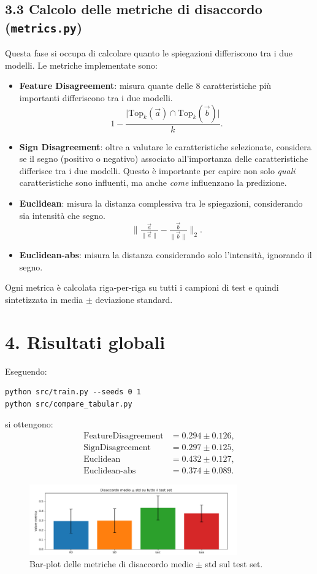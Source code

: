 \documentclass[a4paper,11pt]{article}
\begin{document}
\subsection*{3.3 Calcolo delle metriche di disaccordo (\texttt{metrics.py})}
Questa fase si occupa di calcolare quanto le spiegazioni differiscono tra i due modelli. Le metriche implementate sono:
\begin{itemize}
\item \textbf{Feature Disagreement}: misura quante delle 8 caratteristiche più importanti differiscono tra i due modelli.
  \[
  1 - \frac{\lvert\mathrm{Top}_k(\vec a)\cap \mathrm{Top}_k(\vec b)\rvert}{k}.
  \]
\item \textbf{Sign Disagreement}: oltre a valutare le caratteristiche selezionate, considera se il segno (positivo o negativo) associato all'importanza delle caratteristiche differisce tra i due modelli. Questo è importante per capire non solo \emph{quali} caratteristiche sono influenti, ma anche \emph{come} influenzano la predizione.
\item \textbf{Euclidean}: misura la distanza complessiva tra le spiegazioni, considerando sia intensità che segno.
  \[
  \|\tfrac{\vec a}{\|\vec a\|}-\tfrac{\vec b}{\|\vec b\|}\|_2.
  \]
\item \textbf{Euclidean-abs}: misura la distanza considerando solo l’intensità, ignorando il segno.
\end{itemize}
Ogni metrica è calcolata riga‐per‐riga su tutti i campioni di test e quindi sintetizzata in media \(\pm\) deviazione standard.

\section*{4. Risultati globali}
Eseguendo:
\begin{verbatim}
python src/train.py --seeds 0 1
python src/compare_tabular.py
\end{verbatim}
si ottengono: 
\[
\begin{aligned}
\text{FeatureDisagreement} &= 0.294 \pm 0.126,\\
\text{SignDisagreement}    &= 0.297 \pm 0.125,\\
\text{Euclidean}           &= 0.432 \pm 0.127,\\
\text{Euclidean-abs}       &= 0.374 \pm 0.089.
\end{aligned}
\]

\begin{figure}[htbp]
  \centering
  \includegraphics[width=0.8\textwidth]{globali.png}
  \caption{Bar-plot delle metriche di disaccordo medie $\pm$ std sul test set.}
  \label{fig:globali.png}
\end{figure}
\end{document}
